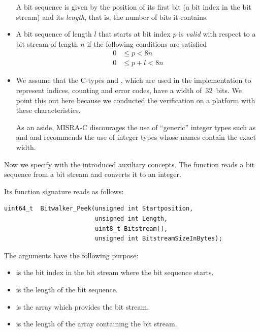 \begin{itemize}
A bit sequence is given by the position of its first bit (a bit index in the bit stream)
and its \emph{length}, that is, the number of bits it contains.

\item A bit sequence of length $l$ that starts at bit index $p$ is \emph{valid}
     with respect to a bit stream of length $n$ if the following conditions are
     satisfied
     \begin{align*}
         0 &\leq p < 8n \\
         0 &\leq p + l < 8n
     \end{align*}

\item 
We assume that the C-types  and , which
are used in the implementation to represent indices, counting and error codes,
have a width of~32~bits.
We point this out here because we conducted the verification on a platform with
these characteristics.

As an aside, MISRA-C discourages the use of ``generic'' integer types
such as  and  and recommends the use of integer types whose names
contain the exact width.

\end{itemize}

Now we specify \peek with the introduced auxiliary concepts.
The function \peek reads a bit sequence from a bit stream
and converts it to an integer.

Its function signature reads as follows:

\begin{lstlisting}[style=acsl-block]
uint64_t  Bitwalker_Peek(unsigned int Startposition, 
                         unsigned int Length,
                         uint8_t Bitstream[],
                         unsigned int BitstreamSizeInBytes);
\end{lstlisting}

The arguments have the following purpose:
\begin{itemize}
    \item {} is the bit index in the bit stream 
    where the bit sequence starts.
    \item {} is the length of the bit sequence.
    \item {} is the array which provides the bit stream.
    \item {} is the length of the array 
    containing the bit stream. 
\end{itemize}

